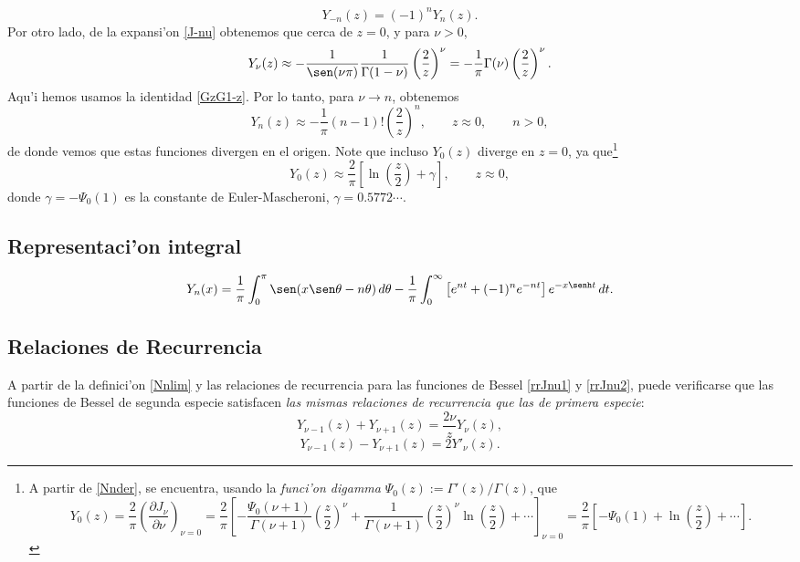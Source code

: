 \begin{equation}
\boxed{Y_{-n}(z)=(-1)^nY_n(z).}
\end{equation}
Por otro lado, de la expansi'on \eqref{J-nu} obtenemos que cerca de $z=0$, y para $\nu>0$,
\begin{equation}
Y_\nu(z)\approx -\frac{1}{\sen(\nu\pi)}\frac{1}{\Gamma(1-\nu)}\left(\frac{2}{z}\right)^\nu=-\frac{1}{\pi}\Gamma{(\nu)}\left(\frac{2}{z}\right)^\nu.
\end{equation}
Aqu'i hemos usamos la identidad \eqref{GzG1-z}. Por lo tanto, para $\nu\to n$, obtenemos
\begin{equation}
Y_n(z)\approx -\frac{1}{\pi}(n-1)!\left(\frac{2}{z}\right)^n, \qquad z\approx 0, \qquad n>0,
\end{equation}
de donde vemos que estas funciones divergen en el origen. Note que incluso $Y_0(z)$ diverge en $z=0$, ya que\footnote{A partir de \eqref{Nnder}, se encuentra, usando la \textit{funci'on  digamma} $\Psi_0(z):=\Gamma'(z)/\Gamma(z)$, que \begin{equation}
Y_0(z)=\frac{2}{\pi}\left(\frac{\partial J_\nu}{\partial\nu}\right)_{\nu=0}=\frac{2}{\pi}\left[-\frac{\Psi_0(\nu+1)}{\Gamma(\nu+1)}\left(\frac{z}{2}\right)^\nu+\frac{1}{\Gamma(\nu+1)}\left(\frac{z}{2}\right)^\nu\ln\left(\frac{z}{2}\right)+\cdots\right]_{\nu=0}=\frac{2}{\pi}\left[-\Psi_0(1)+\ln\left(\frac{z}{2}\right)+\cdots\right].
\end{equation}}  
\begin{equation}
Y_0(z)\approx \frac{2}{\pi}\left[\ln\left(\frac{z}{2}\right) + \gamma \right], \qquad z\approx 0,	
\end{equation}
donde $\gamma=-\Psi_0(1)$ es la constante de Euler-Mascheroni, $\gamma=0.5772\cdots$.


\subsection{Representaci'on integral}
\begin{equation}
Y_n(x) =\frac{1}{\pi} \int_0^\pi \sen(x \sen\theta - n\theta) \, d\theta
- \frac{1}{\pi} \int_0^\infty\left[ e^{n t} + (-1)^n e^{-n t} \right]
 e^{-x \senh t} \, dt.
\end{equation}


\subsection{Relaciones de Recurrencia}
A partir de la definici'on \eqref{Nnlim} y las relaciones de recurrencia para las funciones de Bessel \eqref{rrJnu1} y \eqref{rrJnu2}, puede verificarse que las funciones de Bessel de segunda especie satisfacen \textit{las mismas relaciones de recurrencia que las de primera especie}:
\begin{equation}\label{rrNnu1}
Y_{\nu-1}(z)+Y_{\nu+1}(z)=\frac{2\nu}{z}Y_\nu(z),
\end{equation}
\begin{equation}\label{rrNnu2}
Y_{\nu-1}(z)-Y_{\nu+1}(z)=2Y'_\nu(z).
\end{equation}



